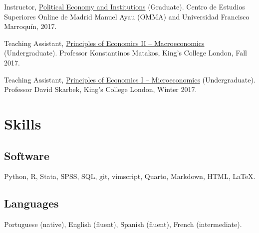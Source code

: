 \documentclass[a4paper]{article}
\renewenvironment{itemize}{
	\begin{list}{}{
			\setlength{\leftmargin}{1.5em}
		}
		}{
	\end{list}
}
\begin{document}
\begin{itemize}
\item Instructor, \href{https://github.com/danilofreire/economia-politica-instituicoes-ufm}{Political Economy and Institutions} (Graduate). Centro de Estudios Superiores Online de Madrid Manuel Ayau (OMMA) and Universidad Francisco Marroquín, 2017.
\item Teaching Assistant, \href{https://github.com/danilofreire/core-econ}{Principles of Economics II -- Macroeconomics} (Undergraduate). Professor Konstantinos Matakos, King's College London, Fall 2017.
\item Teaching Assistant, \href{https://github.com/danilofreire/core-econ}{Principles of Economics I -- Microeconomics} (Undergraduate). Professor David Skarbek, King's College London, Winter 2017.
\end{itemize}

\section*{Skills}

\subsection*{Software}

\begin{itemize}
\item Python, R, Stata, SPSS, SQL, git, vimscript, Quarto, Markdown, HTML, \LaTeX{}.
\end{itemize}

\subsection*{Languages}

\begin{itemize}
\item Portuguese (native), English (fluent), Spanish (fluent), French (intermediate).
\end{itemize}


\end{document}

